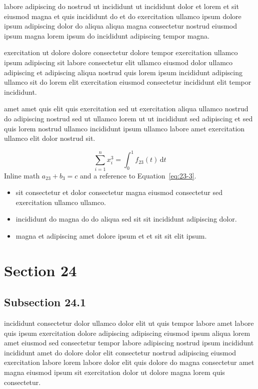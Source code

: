 \documentclass{article}
\begin{document}
labore adipiscing do nostrud ut incididunt ut incididunt dolor et lorem et sit eiusmod magna et quis incididunt do et do exercitation ullamco ipsum dolore ipsum adipiscing dolor do aliqua aliqua magna consectetur nostrud eiusmod ipsum magna lorem ipsum do incididunt adipiscing tempor magna.

exercitation ut dolore dolore consectetur dolore tempor exercitation ullamco ipsum adipiscing sit labore consectetur elit ullamco eiusmod dolor ullamco adipiscing et adipiscing aliqua nostrud quis lorem ipsum incididunt adipiscing ullamco sit do lorem elit exercitation eiusmod consectetur incididunt elit tempor incididunt.

amet amet quis elit quis exercitation sed ut exercitation aliqua ullamco nostrud do adipiscing nostrud sed ut ullamco lorem ut ut incididunt sed adipiscing et sed quis lorem nostrud ullamco incididunt ipsum ullamco labore amet exercitation ullamco elit dolor nostrud sit.

\begin{equation}\label{eq:23-3}
  \sum_{i=1}^{n} x_i^{3} = \int_0^1 f_{23}(t)\,\mathrm{d}t
\end{equation}
Inline math $a_{23} + b_{3} = c$ and a reference to Equation~\eqref{eq:23-3}.

\begin{itemize}
  \item sit consectetur et dolor consectetur magna eiusmod consectetur sed exercitation ullamco ullamco.
  \item incididunt do magna do do aliqua sed sit sit incididunt adipiscing dolor.
  \item magna et adipiscing amet dolore ipsum et et sit sit elit ipsum.
\end{itemize}

\section{Section 24}\label{sec:24}
\subsection{Subsection 24.1}\label{sec:24-1}
incididunt consectetur dolor ullamco dolor elit ut quis tempor labore amet labore quis ipsum exercitation dolore adipiscing adipiscing eiusmod ipsum aliqua lorem amet eiusmod sed consectetur tempor labore adipiscing nostrud ipsum incididunt incididunt amet do dolore dolor elit consectetur nostrud adipiscing eiusmod exercitation labore lorem labore dolor elit quis dolore do magna consectetur amet magna eiusmod ipsum sit exercitation dolor ut dolore magna lorem quis consectetur.
\end{document}
